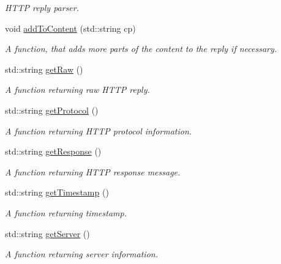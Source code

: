 \begin{DoxyCompactItemize}
\begin{DoxyCompactList}\small\item\em H\-T\-T\-P reply parser. \end{DoxyCompactList}\item 
void \hyperlink{class_net_socket_p_p_1_1_h_t_t_p_reply_a07071d35197f3f4217be5b1b330d9e31}{add\-To\-Content} (std\-::string cp)
\begin{DoxyCompactList}\small\item\em A function, that adds more parts of the content to the reply if necessary. \end{DoxyCompactList}\item 
std\-::string \hyperlink{class_net_socket_p_p_1_1_h_t_t_p_reply_a2302029e3b68ae404fc7d0610a119a1e}{get\-Raw} ()
\begin{DoxyCompactList}\small\item\em A function returning raw H\-T\-T\-P reply. \end{DoxyCompactList}\item 
std\-::string \hyperlink{class_net_socket_p_p_1_1_h_t_t_p_reply_a61def153ad4e5ca5a82b9f80eb66a842}{get\-Protocol} ()
\begin{DoxyCompactList}\small\item\em A function returning H\-T\-T\-P protocol information. \end{DoxyCompactList}\item 
std\-::string \hyperlink{class_net_socket_p_p_1_1_h_t_t_p_reply_ab7b23f9fa3ced6d0243a8a9b5d65fb91}{get\-Response} ()
\begin{DoxyCompactList}\small\item\em A function returning H\-T\-T\-P response message. \end{DoxyCompactList}\item 
std\-::string \hyperlink{class_net_socket_p_p_1_1_h_t_t_p_reply_ab0d92359b15b40b1b91305819f16b1f5}{get\-Timestamp} ()
\begin{DoxyCompactList}\small\item\em A function returning timestamp. \end{DoxyCompactList}\item 
std\-::string \hyperlink{class_net_socket_p_p_1_1_h_t_t_p_reply_a57faaec28d71b168af5d7c63b4dce77a}{get\-Server} ()
\begin{DoxyCompactList}\small\item\em A function returning server information. \end{DoxyCompactList}\item 

\end{DoxyCompactItemize}
